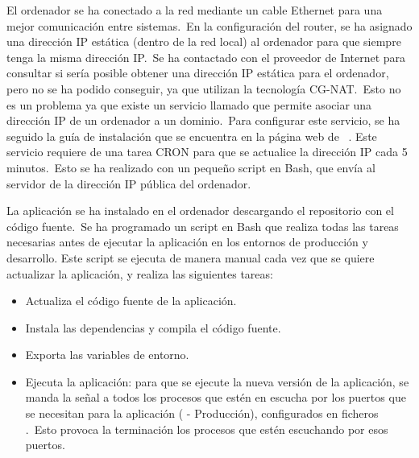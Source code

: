 El ordenador se ha conectado a la red mediante un cable Ethernet para una mejor comunicación entre sistemas.\
En la configuración del router, se ha asignado una dirección IP estática (dentro de la red local) al
ordenador para que siempre tenga la misma dirección IP.\ Se ha contactado con el proveedor de Internet para consultar
si sería posible obtener una dirección IP estática para el ordenador, pero no se ha podido conseguir, ya que
utilizan la tecnología CG-NAT.\ Esto no es un problema ya que existe un servicio llamado \boldFont{DuckDNS} que permite
asociar una dirección IP de un ordenador a un dominio.\ Para configurar este servicio, se ha seguido la guía de
instalación que se encuentra en la página web de \boldFont{DuckDNS}~\cite{DuckDNSi96:online}.
Este servicio requiere de una tarea CRON para que se actualice la dirección IP cada 5 minutos.\ Esto se ha realizado con
un pequeño script en Bash, que envía al servidor de \boldFont{DuckDNS} la dirección IP pública del ordenador.


La aplicación se ha instalado en el ordenador descargando el repositorio con el código fuente.\ Se ha programado un
script
en Bash que realiza todas las tareas necesarias antes de ejecutar la aplicación en los entornos de producción y
desarrollo.
Este script se ejecuta de manera manual cada vez que se quiere actualizar la aplicación, y realiza las siguientes
tareas:
\begin{itemize}
	\item Actualiza el código fuente de la aplicación.
	\item Instala las dependencias y compila el código fuente.
	\item Exporta las variables de entorno.
	\item Ejecuta la aplicación: para que se ejecute la nueva versión de la aplicación, se manda la señal
	\monoFont{TERM} a todos los procesos que estén en escucha por los puertos que se necesitan para la aplicación
	(\boldFont{4040} - Producción), configurados en ficheros \monoFont{.env}.\ Esto provoca la terminación los procesos
	que estén escuchando por esos puertos.
\end{itemize}
\label{itm:script_tasks}

